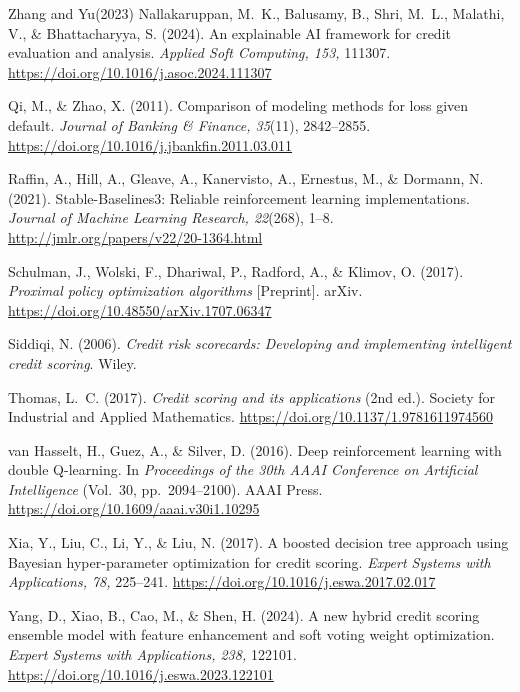 \documentclass[preprint,review,authoryear,12pt]{elsarticle}
\begin{document}
\begin{thebibliography}{Zhang and Yu(2023)}
    Nallakaruppan, M.~K., Balusamy, B., Shri, M.~L., Malathi, V., \& Bhattacharyya, S. (2024).
    An explainable AI framework for credit evaluation and analysis.
    \textit{Applied Soft Computing, 153,} 111307.
    \url{https://doi.org/10.1016/j.asoc.2024.111307}

    Qi, M., \& Zhao, X. (2011).
    Comparison of modeling methods for loss given default.
    \textit{Journal of Banking \& Finance, 35}(11), 2842--2855.
    \url{https://doi.org/10.1016/j.jbankfin.2011.03.011}

    Raffin, A., Hill, A., Gleave, A., Kanervisto, A., Ernestus, M., \& Dormann, N. (2021).
    Stable-Baselines3: Reliable reinforcement learning implementations.
    \textit{Journal of Machine Learning Research, 22}(268), 1--8.
    \url{http://jmlr.org/papers/v22/20-1364.html}

    Schulman, J., Wolski, F., Dhariwal, P., Radford, A., \& Klimov, O. (2017).
    \textit{Proximal policy optimization algorithms} [Preprint]. arXiv.
    \url{https://doi.org/10.48550/arXiv.1707.06347}

    Siddiqi, N. (2006).
    \textit{Credit risk scorecards: Developing and implementing intelligent credit scoring}. Wiley.

    Thomas, L.~C. (2017).
    \textit{Credit scoring and its applications} (2nd ed.).
    Society for Industrial and Applied Mathematics.
    \url{https://doi.org/10.1137/1.9781611974560}

    van Hasselt, H., Guez, A., \& Silver, D. (2016).
    Deep reinforcement learning with double Q-learning. In \textit{Proceedings of the 30th
        AAAI Conference on Artificial Intelligence} (Vol.~30, pp.~2094--2100). AAAI Press.
    \url{https://doi.org/10.1609/aaai.v30i1.10295}

    Xia, Y., Liu, C., Li, Y., \& Liu, N. (2017).
    A boosted decision tree approach using Bayesian hyper-parameter optimization for credit scoring.
    \textit{Expert Systems with Applications, 78,} 225--241.
    \url{https://doi.org/10.1016/j.eswa.2017.02.017}

    Yang, D., Xiao, B., Cao, M., \& Shen, H. (2024).
    A new hybrid credit scoring ensemble model with feature enhancement and soft voting weight optimization.
    \textit{Expert Systems with Applications, 238,} 122101.
    \url{https://doi.org/10.1016/j.eswa.2023.122101}


\end{thebibliography}
\end{document}
